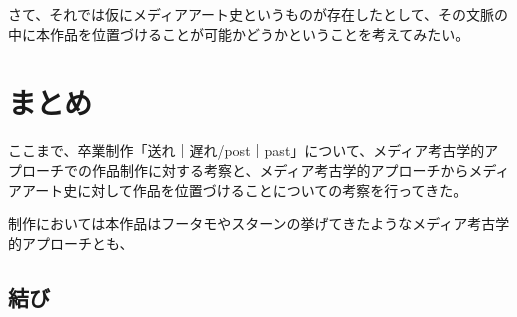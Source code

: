 さて、それでは仮にメディアアート史というものが存在したとして、その文脈の中に本作品を位置づけることが可能かどうかということを考えてみたい。

\chapter{まとめ}\label{ux307eux3068ux3081}

ここまで、卒業制作「送れ｜遅れ/post｜past」について、メディア考古学的アプローチでの作品制作に対する考察と、メディア考古学的アプローチからメディアアート史に対して作品を位置づけることについての考察を行ってきた。

制作においては本作品はフータモやスターンの挙げてきたようなメディア考古学的アプローチとも、

\section{結び}\label{ux7d50ux3073}
